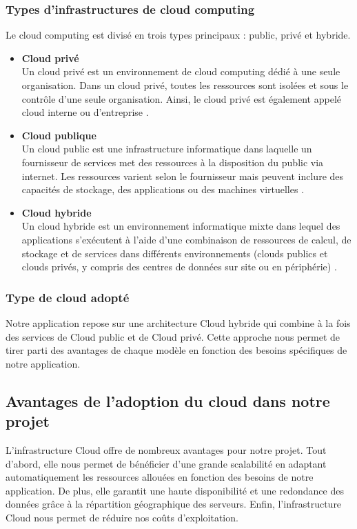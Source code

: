 \subsubsection{Types d'infrastructures de cloud computing}
\justifying
Le cloud computing est divisé en trois types principaux : public, privé et hybride.
\begin{itemize}[itemsep=2pt, parsep=2pt]
    \item \textbf{Cloud privé}\\ Un cloud privé est un environnement de cloud computing dédié à une seule organisation. Dans un cloud privé, toutes les ressources sont isolées et sous le contrôle d'une seule organisation. Ainsi, le cloud privé est également appelé cloud interne ou d'entreprise \cite{cloudPrivé}.
    \item \textbf{Cloud publique}\\ Un cloud public est une infrastructure informatique dans laquelle un fournisseur de services met des ressources à la disposition du public via internet. Les ressources varient selon le fournisseur mais peuvent inclure des capacités de stockage, des applications ou des machines virtuelles \cite{CloudPublique}.
    \item \textbf{Cloud hybride}\\ Un cloud hybride est un environnement informatique mixte dans lequel des applications s'exécutent à l'aide d'une combinaison de ressources de calcul, de stockage et de services dans différents environnements (clouds publics et clouds privés, y compris des centres de données sur site ou en périphérie) \cite{CloudHybride}.
\end{itemize}

\subsubsection{Type de cloud adopté}
\justifying
Notre application repose sur une architecture Cloud hybride qui combine à la fois des services de Cloud public et de Cloud privé. Cette approche nous permet de tirer parti des avantages de chaque modèle en fonction des besoins spécifiques de notre application. 

\subsection{Avantages de l’adoption du cloud dans notre projet}
\justifying
L'infrastructure Cloud offre de nombreux avantages pour notre projet. Tout d'abord, elle nous permet de bénéficier d'une grande scalabilité en adaptant automatiquement les ressources allouées en fonction des besoins de notre application. De plus, elle garantit une haute disponibilité et une redondance des données grâce à la répartition géographique des serveurs. Enfin, l'infrastructure Cloud nous permet de réduire nos coûts d'exploitation. 

